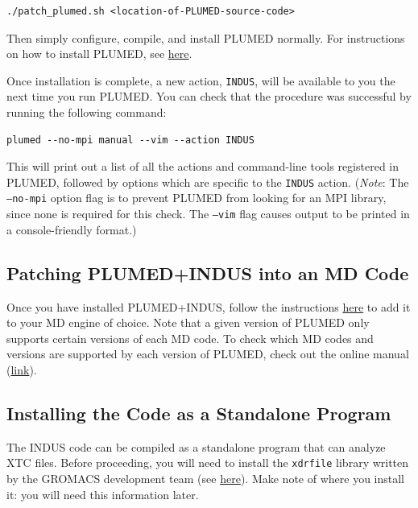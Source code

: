 \documentclass[11pt,notitlepage]{article}
\newcommand{\plumedmanual}[1][link]{\href{https://plumed.github.io/doc.html}{#1}}
\newcommand{\plumeddoc}{https://plumed.github.io/doc-v2.4/user-doc/html}
\newcommand{\installplumed}[1][link]{\href{\plumeddoc/_installation.html}{#1}}
\begin{document}
\begin{lstlisting}
./patch_plumed.sh <location-of-PLUMED-source-code>
\end{lstlisting}

Then simply configure, compile, and install PLUMED normally. For instructions on how to install PLUMED, see \installplumed[here].

Once installation is complete, a new action, \texttt{INDUS}, will be available to you the next time you run PLUMED. You can check that the procedure was successful by running the following command:

\begin{lstlisting}
plumed --no-mpi manual --vim --action INDUS
\end{lstlisting}

This will print out a list of all the actions and command-line tools registered in PLUMED, followed by options which are specific to the \texttt{INDUS} action. (\emph{Note}: The \texttt{--no-mpi} option flag is to prevent PLUMED from looking for an MPI library, since none is required for this check. The \texttt{--vim} flag causes output to be printed in a console-friendly format.)


\subsection{Patching PLUMED+INDUS into an MD Code}

Once you have installed PLUMED+INDUS, follow the instructions \href{\plumeddoc/_installation.html#Patching}{here} to add it to your MD engine of choice. Note that a given version of PLUMED only supports certain versions of each MD code. To check which MD codes and versions are supported by each version of PLUMED, check out the online manual (\plumedmanual).


\subsection{Installing the Code as a Standalone Program}

The INDUS code can be compiled as a standalone program that can analyze XTC files. Before proceeding, you will need to install the \texttt{xdrfile} library written by the GROMACS development team (see \href{http://www.gromacs.org/Developer_Zone/Programming_Guide/XTC_Library}{here}). Make note of where you install it: you will need this information later.
\end{document}

